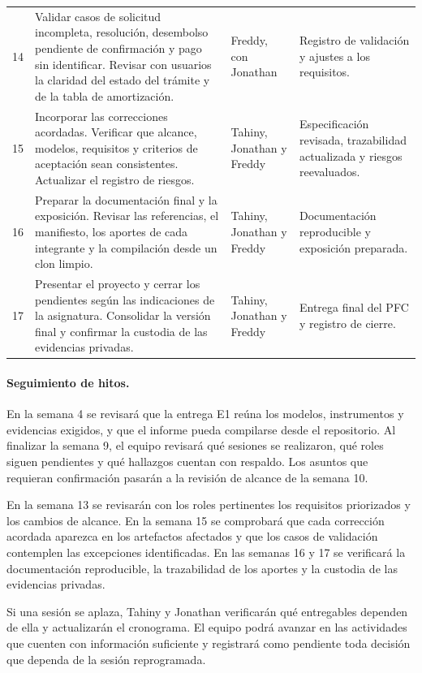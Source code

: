 \documentclass[11pt,a4paper]{article}
\begin{document}
\begin{longtable}{@{}L{.09}L{.39}L{.14}L{.28}@{}}
14 & Validar casos de solicitud incompleta, resolución, desembolso
pendiente de confirmación y pago sin identificar. Revisar con
usuarios la claridad del estado del trámite y de la tabla de
amortización.
& Freddy, con Jonathan
& Registro de validación y ajustes a los requisitos. \\

15 & Incorporar las correcciones acordadas. Verificar que alcance,
modelos, requisitos y criterios de aceptación sean consistentes.
Actualizar el registro de riesgos.
& Tahiny, Jonathan y Freddy
& Especificación revisada, trazabilidad actualizada y riesgos
reevaluados. \\
\addlinespace

16 & Preparar la documentación final y la exposición. Revisar
las referencias, el manifiesto, los aportes de cada integrante
y la compilación desde un clon limpio.
& Tahiny, Jonathan y Freddy
& Documentación reproducible y exposición preparada. \\
\addlinespace

17 & Presentar el proyecto y cerrar los pendientes según las
indicaciones de la asignatura. Consolidar la versión final y
confirmar la custodia de las evidencias privadas.
& Tahiny, Jonathan y Freddy
& Entrega final del PFC y registro de cierre. \\

\end{longtable}
\endgroup
\paragraph{Seguimiento de hitos.}
En la semana 4 se revisará que la entrega E1 reúna los modelos,
instrumentos y evidencias exigidos, y que el informe pueda compilarse
desde el repositorio. Al finalizar la semana 9, el equipo revisará qué
sesiones se realizaron, qué roles siguen pendientes y qué hallazgos
cuentan con respaldo. Los asuntos que requieran confirmación pasarán
a la revisión de alcance de la semana 10.

En la semana 13 se revisarán con los roles pertinentes los requisitos
priorizados y los cambios de alcance. En la semana 15 se comprobará
que cada corrección acordada aparezca en los artefactos afectados y
que los casos de validación contemplen las excepciones identificadas.
En las semanas 16 y 17 se verificará la documentación reproducible, la
trazabilidad de los aportes y la custodia de las evidencias privadas.

Si una sesión se aplaza, Tahiny y Jonathan verificarán qué entregables
dependen de ella y actualizarán el cronograma. El equipo podrá avanzar
en las actividades que cuenten con información suficiente y registrará
como pendiente toda decisión que dependa de la sesión reprogramada.
\end{document}

